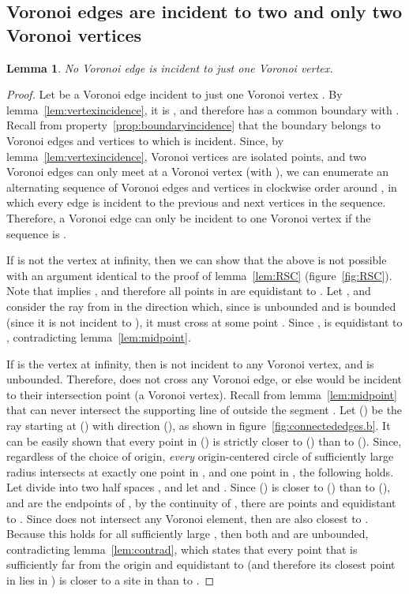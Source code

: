 \documentclass[11pt]{article}
\newtheorem{lemma}{Lemma}
\begin{document}
\subsection{Voronoi edges are incident to two and only two Voronoi vertices}



\begin{lemma}\label{lem:val_ge2}
No Voronoi edge is incident to just one Voronoi vertex.
\end{lemma}
\begin{proof}
Let  be a Voronoi edge incident to just one Voronoi vertex . 
By lemma~\ref{lem:vertexincidence}, it is , 
	and therefore  has a common boundary with . 
Recall from property~\ref{prop:boundaryincidence} that the boundary  belongs 
	to Voronoi edges and vertices to which  is incident. 
Since, by lemma~\ref{lem:vertexincidence}, Voronoi vertices are isolated points, 
	and two Voronoi edges  can only meet at a Voronoi vertex  (with ), 
	we can enumerate an alternating sequence of Voronoi edges and vertices 
	 in clockwise order around , 
	in which every edge is incident to the previous and next vertices in the sequence. 
Therefore, a Voronoi edge can only be incident to one Voronoi vertex if the sequence is . 

If  is not the vertex at infinity, then we can show that the above is not possible 
	with an argument identical to the proof of lemma~\ref{lem:RSC} (figure~\ref{fig:RSC}). 
Note that  implies , 
	and therefore all points in  are equidistant to . 
Let , and consider the ray  from  in the direction  
	which, since  is unbounded and  is bounded (since it is not incident to ), 
	it must cross  at some point . 
Since ,  is equidistant to , contradicting lemma~\ref{lem:midpoint}. 

If  is the vertex at infinity, then  is not incident to any Voronoi vertex, and is unbounded. 
Therefore,  does not cross any Voronoi edge, 
	or else  would be incident to their intersection point (a Voronoi vertex). 
Recall from lemma~\ref{lem:midpoint} 
	that 	 can never intersect the supporting line  of  outside the segment . 
Let  () be the ray starting at  () with direction  (), 
as shown in figure~\ref{fig:connectededges.b}. 
It can be easily shown that every point in  () is strictly closer to  () than to  (). 
Since, regardless of the choice of origin, 
	\emph{every} origin-centered circle  of sufficiently large radius  intersects  at 
	exactly one point  in , and one point  in ,
	the following holds. 
Let  divide  into two half spaces , 
	and let  and
		    . 
Since  () is closer to  () than to  (), 
	and  are the endpoints of , 
	by the continuity of , 
	there are points  and  equidistant to . 
Since  does not intersect any Voronoi element, then  are also closest to . 
Because this holds for all sufficiently large , 
	then both  and  are unbounded, 
	contradicting lemma~\ref{lem:contrad}, 
	which states that every point  that is sufficiently far from the origin
	and equidistant to  (and therefore its closest point in  lies in ) 
	is closer to a site in  than to . 
\end{proof}
\end{document}
